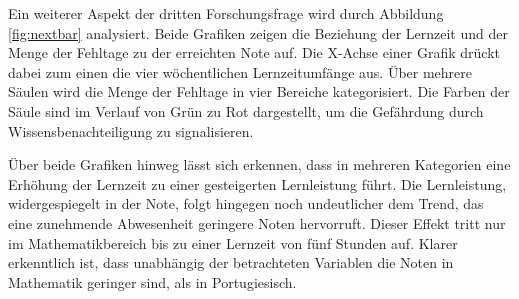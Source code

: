 Ein weiterer Aspekt der dritten Forschungsfrage wird durch Abbildung \ref{fig:nextbar} analysiert.
Beide Grafiken zeigen die Beziehung der Lernzeit und der Menge der Fehltage zu der erreichten Note auf.
Die X-Achse einer Grafik drückt dabei zum einen die vier wöchentlichen Lernzeitumfänge aus.
Über mehrere Säulen wird die Menge der Fehltage in vier Bereiche kategorisiert. 
Die Farben der Säule sind im Verlauf von Grün zu Rot dargestellt, um die Gefährdung durch Wissensbenachteiligung zu signalisieren.

Über beide Grafiken hinweg lässt sich erkennen, dass in mehreren Kategorien eine Erhöhung der Lernzeit zu einer gesteigerten Lernleistung führt.
Die Lernleistung, widergespiegelt in der Note, folgt hingegen noch undeutlicher dem Trend, das eine zunehmende Abwesenheit geringere Noten hervorruft.
Dieser Effekt tritt nur im Mathematikbereich bis zu einer Lernzeit von fünf Stunden auf.
Klarer erkenntlich ist, dass unabhängig der betrachteten Variablen die Noten in Mathematik geringer sind, als in Portugiesisch.

